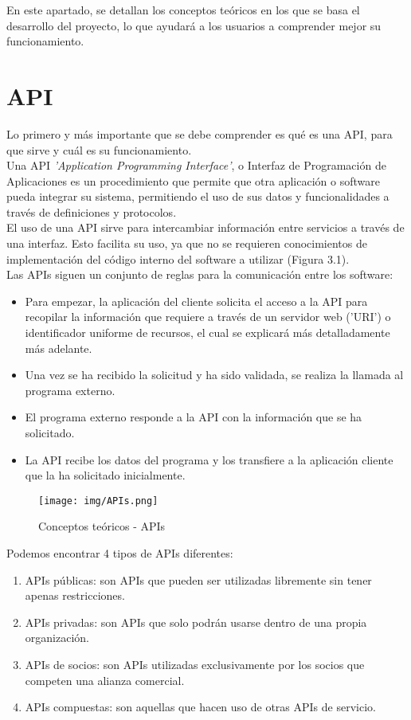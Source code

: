 En este apartado, se detallan los conceptos teóricos en los que se basa el desarrollo del proyecto, lo que ayudará a los usuarios a comprender mejor su funcionamiento.

\section{API}

Lo primero y más importante que se debe comprender es qué es una API, para que sirve y cuál es su funcionamiento.\cite{api}\\
Una API \textit{'Application Programming Interface'}, o Interfaz de Programación de Aplicaciones es un procedimiento que permite que otra aplicación o software pueda integrar su sistema, permitiendo el uso de sus datos y funcionalidades a través de definiciones y protocolos. \\
El uso de una API sirve para intercambiar información entre servicios a través de una interfaz. Esto facilita su uso, ya que no se requieren conocimientos de implementación del código interno del software a utilizar (Figura 3.1).\\
Las APIs siguen un conjunto de reglas para la comunicación entre los software:
\begin{itemize}
    \item Para empezar, la aplicación del cliente solicita el acceso a la API para recopilar la información que requiere a través de un servidor web ('URI') o identificador uniforme de recursos, el cual se explicará más detalladamente más adelante.
    \item Una vez se ha recibido la solicitud y ha sido validada, se realiza la llamada al programa externo.
    \item El programa externo responde a la API con la información que se ha solicitado.
    \item La API recibe los datos del programa y los transfiere a la aplicación cliente que la ha solicitado inicialmente.
\end{itemize}

\begin{figure}[h!]
    \centering
    \texttt{[image: img/APIs.png]}
    \caption{Conceptos teóricos - APIs}
    \label{Conceptos teóricos - APIs}
\end{figure}

Podemos encontrar 4 tipos de APIs diferentes:
\begin{enumerate}
    \item APIs públicas: son APIs que pueden ser utilizadas libremente sin tener apenas restricciones.
    \item APIs privadas: son APIs que solo podrán usarse dentro de una propia organización.
    \item APIs de socios: son APIs utilizadas exclusivamente por los socios que competen una alianza comercial.
    \item APIs compuestas: son aquellas que hacen uso de otras APIs de servicio.
\end{enumerate}

